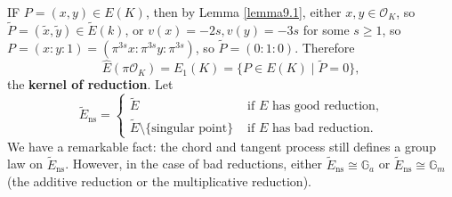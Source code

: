 \documentclass{article}
\theoremstyle{definition}
\begin{document}
IF $P=(x,y) \in E(K)$, then by Lemma \ref{lemma9.1}, either $x, y \in \mathcal{O}_K$, so $\widetilde{P}=(\widetilde{x},\widetilde{y}) \in \widetilde{E}(k)$, or $v(x)=-2s,v(y)=-3s$ for some $s\ge 1$, so $P=(x:y:1) = (\pi^{3s}x : \pi^{3s}y : \pi^{3s})$, so $\widetilde{P} = (0:1:0)$. Therefore \[
\widehat{E}(\pi \mathcal{O}_K) = E_1(K) = \{P \in E(K) \mid  \widetilde{P} = 0\},
\]
the \textbf{kernel of reduction}. Let \[
\widetilde{E}_{\text{ns}} = \begin{cases}
    \widetilde{E} & \text{ if }E \text{ has good reduction,}\\
    \widetilde{E}\setminus \{\text{singular point}\} & \text{ if }E \text{ has bad reduction.}
\end{cases}
\]
We have a remarkable fact: the chord and tangent process still defines a group law on $\widetilde{E}_{\text{ns}}$. However, in the case of bad reductions, either $\widetilde{E}_{\text{ns}} \cong \mathbb{G}_a$ or $\widetilde{E}_{\text{ns}} \cong \mathbb{G}_m$ (the additive reduction or the multiplicative reduction).
\end{document}
